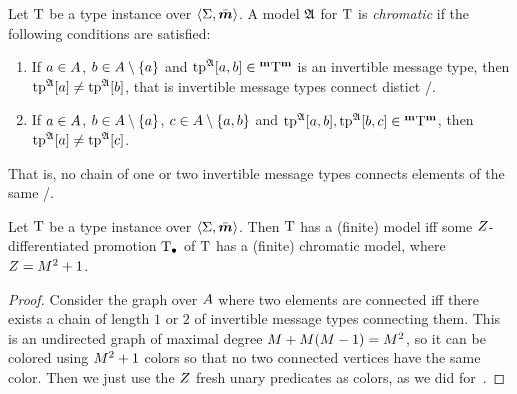 \begin{definition}
Let $\mathrm{T}$ be a type instance over $\left\langle \mathrm{\Sigma},\bar{\bm{m}} \right\rangle$.
A model $\mathfrak{A}$ for $\mathrm{T}$ is \emph{chromatic}
if the following conditions are satisfied:
\begin{enumerate}
  \item If $a\in A$, $b\in A\setminus\left\{a\right\}$ and
  $\operatorname{tp}^{\mathfrak{A}}[a,b]\in{{}^{\bm{\mathrm{m}}}{\mathrm{T}}^{\bm{\mathrm{m}}}}$ is an invertible message type,
  then $\operatorname{tp}^{\mathfrak{A}}[a]\neq\operatorname{tp}^{\mathfrak{A}}[b]$, that is invertible message types
  connect distict \onetypes/.
  \item If $a\in A$, $b\in A\setminus\left\{a\right\}$,
  $c\in A\setminus\left\{a,b\right\}$ and $\operatorname{tp}^{\mathfrak{A}}[a,b], 
  \operatorname{tp}^{\mathfrak{A}}[b,c]\in{{}^{\bm{\mathrm{m}}}{\mathrm{T}}^{\bm{\mathrm{m}}}}$, then $\operatorname{tp}^{\mathfrak{A}}[a]\neq\operatorname{tp}^{\mathfrak{A}}[c]$.
\end{enumerate}
That is, no chain of one or two invertible message types connects elements of
the same \onetype/.
\end{definition}
\begin{remark}
Let $\mathrm{T}$ be a type instance over $\left\langle \mathrm{\Sigma},\bar{\bm{m}} \right\rangle$.
Then $\mathrm{T}$ has a (finite) model iff some $Z$-differentiated promotion $\mathrm{T}_{\bullet}$
of $\mathrm{T}$ has a (finite) chromatic model, where $Z = M^2+1$.
\end{remark}
\begin{proof}
Consider the graph over $A$ where two elements are connected iff there
exists a chain of length $1$ or $2$ of invertible message types connecting them.
This is an undirected graph of maximal degree $M + M(M-1) = M^2$, so it
can be colored using $M^2+1$ colors so that no two connected vertices have the
same color.
Then we just use the $Z$ fresh unary predicates as colors, as we did
for~.
\end{proof}

